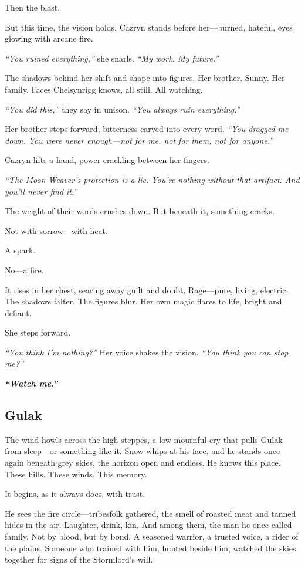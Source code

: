 \documentclass[10pt,a4paper,bg=print,twocolumn,openany,nodeprecatedcode]{dndarticle}
\begin{document}
Then the blast.

But this time, the vision holds. Cazryn stands before her—burned, hateful, eyes glowing with arcane fire.

\textit{“You ruined everything,”} she snarls. \textit{“My work. My future.”}

The shadows behind her shift and shape into figures. Her brother. Sunny. Her family. Faces Chelsynrigg knows, all still. All watching.

\textit{“You did this,”} they say in unison. \textit{“You always ruin everything.”}

Her brother steps forward, bitterness carved into every word. \textit{“You dragged me down. You were never enough—not for me, not for them, not for anyone.”}

Cazryn lifts a hand, power crackling between her fingers.

\textit{“The Moon Weaver’s protection is a lie. You’re nothing without that artifact. And you’ll never find it.”}

The weight of their words crushes down. But beneath it, something cracks.

Not with sorrow—with heat.

A spark.

No—a fire.

It rises in her chest, searing away guilt and doubt. Rage—pure, living, electric. The shadows falter. The figures blur. Her own magic flares to life, bright and defiant.

She steps forward.

\textit{“You think I’m nothing?”} Her voice shakes the vision. \textit{“You think you can stop me?”}

\textbf{\textit{“Watch me.”}}

\subsection*{Gulak}


The wind howls across the high steppes, a low mournful cry that pulls Gulak from sleep—or something like it. Snow whips at his face, and he stands once again beneath grey skies, the horizon open and endless. He knows this place. These hills. These winds. This memory.

It begins, as it always does, with trust.

He sees the fire circle—tribesfolk gathered, the smell of roasted meat and tanned hides in the air. Laughter, drink, kin. And among them, the man he once called family. Not by blood, but by bond. A seasoned warrior, a trusted voice, a rider of the plains. Someone who trained with him, hunted beside him, watched the skies together for signs of the Stormlord’s will.
\end{document}
